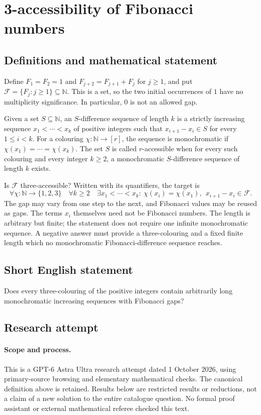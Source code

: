 \documentclass[11pt,a4paper]{article}
\begin{document}
\section*{3-accessibility of Fibonacci numbers}\label{statement}

\subsection{Definitions and mathematical statement}
Define $F_1=F_2=1$ and $F_{j+2}=F_{j+1}+F_j$ for $j\ge1$, and put
$\mathcal F=\{F_j:j\ge1\}\subseteq\mathbb N$. This is a set, so the two
initial occurrences of $1$ have no multiplicity significance. In particular,
$0$ is not an allowed gap.

Given a set $S\subseteq\mathbb N$, an $S$-difference sequence of length
$k$ is a strictly increasing sequence $x_1<\cdots<x_k$ of positive integers
such that $x_{i+1}-x_i\in S$ for every $1\le i<k$.
For a colouring $\chi:\mathbb N\to[r]$, the sequence is monochromatic if
$\chi(x_1)=\cdots=\chi(x_k)$. The set $S$ is called $r$-accessible when
for every such colouring and every integer $k\ge2$, a monochromatic
$S$-difference sequence of length $k$ exists.

Is $\mathcal F$ three-accessible? Written with its quantifiers, the target is
\[
 \forall\chi:\mathbb N\to\{1,2,3\}\quad\forall k\ge2\quad
 \exists x_1<\cdots<x_k:
 \ \chi(x_i)=\chi(x_1),\ \ x_{i+1}-x_i\in\mathcal F.
\]
The gap may vary from one step to the next, and Fibonacci values may be
reused as gaps. The terms $x_i$ themselves need not be Fibonacci numbers.
The length is arbitrary but finite; the statement does not require one
infinite monochromatic sequence. A negative answer must provide a
three-colouring and a fixed finite length which no monochromatic
Fibonacci-difference sequence reaches.
\subsection{Short English statement}
Does every three-colouring of the positive integers contain arbitrarily long monochromatic increasing sequences with Fibonacci gaps?
\subsection{Research attempt}
\paragraph{Scope and process.}
This is a GPT-6 Astra Ultra research attempt dated 1 October 2026, using
primary-source browsing and elementary mathematical checks. The canonical
definition above is retained. Results below are restricted results or
reductions, not a claim of a new solution to the entire catalogue question.
No formal proof assistant or external mathematical referee checked this text.
\end{document}
